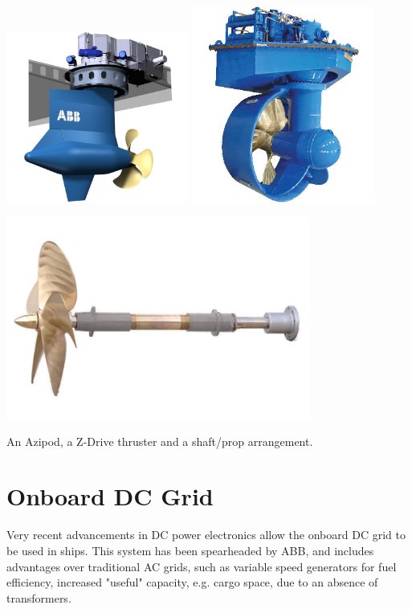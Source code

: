 \documentclass[11pt,a4paper]{article}
\begin{document}
\begin{center}
\includegraphics[width=6cm]{azi}
\includegraphics[width=6cm]{zi}

\includegraphics[width=10cm]{pem}\par
An Azipod, a Z-Drive thruster and a shaft/prop arrangement.
\end{center}
\section{Onboard DC Grid}
Very recent advancements in DC power electronics allow the onboard DC grid to be used in ships. This system has been spearheaded by ABB, and includes advantages over traditional AC grids, such as variable speed generators for fuel efficiency, increased "useful" capacity, e.g. cargo space, due to an absence of transformers.
\end{document}

